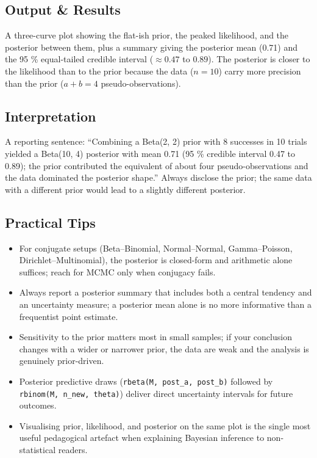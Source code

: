 \documentclass[
]{article}
\providecommand{\tightlist}{%
  \setlength{\itemsep}{0pt}\setlength{\parskip}{0pt}}
\begin{document}
\subsection{Output \& Results}\label{output-results}

A three-curve plot showing the flat-ish prior, the peaked likelihood,
and the posterior between them, plus a summary giving the posterior mean
(0.71) and the 95 \% equal-tailed credible interval (\(\approx 0.47\) to
\(0.89\)). The posterior is closer to the likelihood than to the prior
because the data (\(n=10\)) carry more precision than the prior
(\(a + b = 4\) pseudo-observations).

\subsection{Interpretation}\label{interpretation}

A reporting sentence: ``Combining a Beta(2, 2) prior with 8 successes in
10 trials yielded a Beta(10, 4) posterior with mean 0.71 (95 \% credible
interval 0.47 to 0.89); the prior contributed the equivalent of about
four pseudo-observations and the data dominated the posterior shape.''
Always disclose the prior; the same data with a different prior would
lead to a slightly different posterior.

\subsection{Practical Tips}\label{practical-tips}

\begin{itemize}
\tightlist
\item
  For conjugate setups (Beta--Binomial, Normal--Normal, Gamma--Poisson,
  Dirichlet--Multinomial), the posterior is closed-form and arithmetic
  alone suffices; reach for MCMC only when conjugacy fails.
\item
  Always report a posterior summary that includes both a central
  tendency and an uncertainty measure; a posterior mean alone is no more
  informative than a frequentist point estimate.
\item
  Sensitivity to the prior matters most in small samples; if your
  conclusion changes with a wider or narrower prior, the data are weak
  and the analysis is genuinely prior-driven.
\item
  Posterior predictive draws (\texttt{rbeta(M,\ post\_a,\ post\_b)}
  followed by \texttt{rbinom(M,\ n\_new,\ theta)}) deliver direct
  uncertainty intervals for future outcomes.
\item
  Visualising prior, likelihood, and posterior on the same plot is the
  single most useful pedagogical artefact when explaining Bayesian
  inference to non-statistical readers.
\end{itemize}
\end{document}
